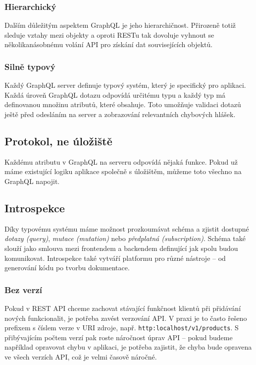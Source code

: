 \documentclass[thesis=M,czech]{FITthesis}[2019/12/23]
\begin{document}
\subsubsection*{Hierarchický}
Dalším důležitým aspektem GraphQL je jeho hierarchičnost. Přirozeně totiž sleduje vztahy mezi objekty a oproti RESTu tak dovoluje vyhnout se několikanásobnému volání API pro získání dat souvisejících objektů.

\subsubsection*{Silně typový}
Každý GraphQL server definuje typový systém, který je specifický pro aplikaci.
Každá úroveň GraphQL dotazu odpovídá určitému typu a každý typ má definovanou množinu atributů, které obsahuje. Toto umožňuje validaci dotazů ještě před odesláním na server a zobrazování relevantních chybových hlášek.

\subsection*{Protokol, ne úložiště}
Každému atributu v GraphQL na serveru odpovídá nějaká funkce. Pokud už máme existující logiku aplikace společně s úložištěm, můžeme toto všechno na GraphQL napojit.

\subsection*{Introspekce}
Díky typovému systému máme možnost prozkoumávat schéma a zjistit dostupné \textit{dotazy (query)}, \textit{mutace (mutation)} nebo \textit{předplatná (subscription)}. Schéma také slouží jako smlouva mezi frontendem a backendem definující jak spolu budou komunikovat.
Introspekce také vytváří platformu pro různé nástroje -- od generování kódu po tvorbu dokumentace.

\subsubsection*{Bez verzí}
Pokud v REST API chceme zachovat stávající funkčnost klientů při přidávání nových funkcionalit, je potřeba zavést verzování API. V praxi je to často řešeno prefixem s číslem verze v URI zdroje, např. \texttt{http:localhost/v1/products}. S přibývajícím počtem verzí pak roste náročnost úprav API -- pokud budeme například opravovat chybu v aplikaci, je potřeba zajistit, že chyba bude opravena ve všech verzích API, což je velmi časově náročné.
\end{document}
